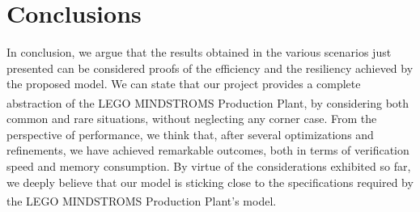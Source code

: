 \documentclass[a4paper,twoside]{article}
\begin{document}
    \section{C\lowercase{onclusions}}

    In conclusion, we argue that the results obtained in the various scenarios just presented can be considered proofs of the efficiency and the resiliency achieved by the proposed model. We can state that our project provides a complete abstraction of the LEGO\textsuperscript{\textregistered} MINDSTROMS\texttrademark{} Production Plant, by considering both common and rare situations, without neglecting any corner case. From the perspective of performance, we think that, after several optimizations and refinements, we have achieved remarkable outcomes, both in terms of verification speed and memory consumption. By virtue of the considerations exhibited so far, we deeply believe that our model is sticking close to the specifications required by the LEGO\textsuperscript{\textregistered} MINDSTROMS\texttrademark{} Production Plant's model.
\end{document}
